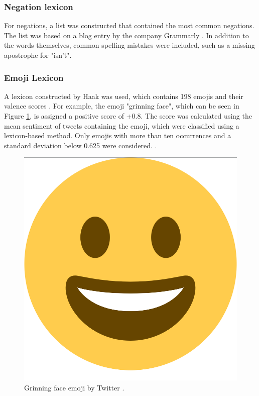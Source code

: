 \subsubsection{Negation lexicon}
For negations, a list was constructed that contained the most common negations. The list was based on a blog entry by the company Grammarly \cite{negations}. In addition to the words themselves, common spelling mistakes were included, such as a missing apostrophe for "isn't".

\subsubsection{Emoji Lexicon}
A lexicon constructed by Haak was used, which contains 198 emojis and their valence scores \cite{haak_dataset}. For example, the emoji "grinning face", which can be seen in Figure \ref{fig:emoji}, is assigned a positive score of +0.8. The score was calculated using the mean sentiment of tweets containing the emoji, which were classified using a lexicon-based method. Only emojis with more than ten occurrences and a standard deviation below 0.625 were considered. \cite{haak_article}.

\begin{figure}
    \centering
    \includegraphics[scale=0.05]{Images/emoji_smile.png}
    \caption{Grinning face emoji by Twitter \cite{twitter:image}.}
    \label{fig:emoji}
\end{figure}



